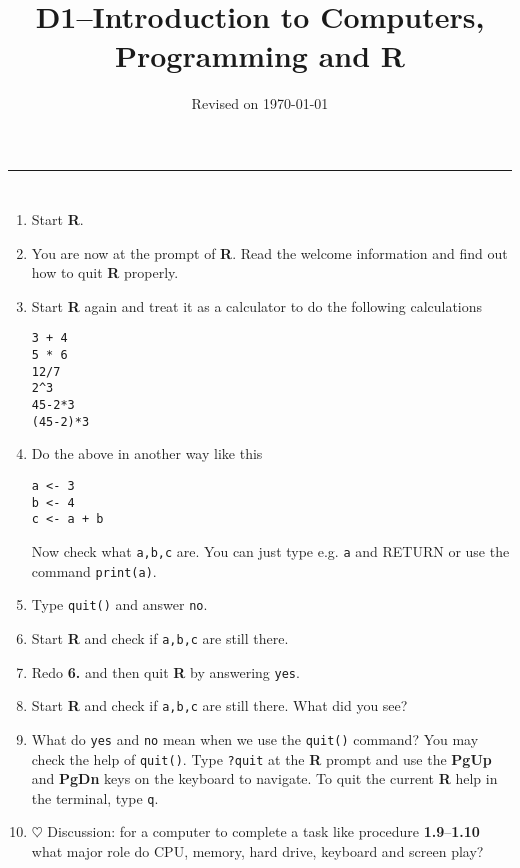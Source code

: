 \documentclass[a4paper]{article}
\title{D1--Introduction to Computers, Programming and R}
\date{\small{Revised on \today}}
\begin{document}
\maketitle
\hrule

\section{}
\begin{enumerate}
\item Start \textbf{R}.
\item You are now at the prompt of \textbf{R}. Read the welcome information and
  find out how to quit \textbf{R} properly.
\item Start \textbf{R} again and treat it as a calculator to do the following
  calculations
\begin{verbatim}
3 + 4
5 * 6
12/7
2^3
45-2*3
(45-2)*3
\end{verbatim}
\item Do the above in another way like this
\begin{verbatim}
a <- 3
b <- 4
c <- a + b
\end{verbatim}
Now check what \texttt{a,b,c} are. You can just type e.g. \texttt{a} and RETURN
or use the command \texttt{print(a)}.

\item Type \texttt{quit()} and answer \texttt{no}.
\item Start \textbf{R} and check if \texttt{a,b,c} are still there.
\item Redo \textbf{6.} and then quit \textbf{R} by answering \texttt{yes}.
\item Start \textbf{R} and check if \texttt{a,b,c} are still there. What did
  you see?
\item What do \texttt{yes} and \texttt{no} mean when we use the \texttt{quit()}
  command? You may check the help of \texttt{quit()}. Type \texttt{?quit} at
  the \textbf{R} prompt and use the \textbf{PgUp} and \textbf{PgDn} keys on the keyboard to
  navigate. To quit the current \textbf{R} help in the terminal, type \texttt{q}.
\item $\heartsuit$ Discussion: for a computer to complete a task like procedure
  \textbf{1.9}--\textbf{1.10} what major role do CPU, memory, hard drive,
  keyboard and screen play?
\end{enumerate}
\end{document}
